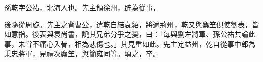 \begin{pinyinscope}
 
 
 孫乾字公祐，北海人也。先主領徐州，辟為從事，
 
 
 後隨從周旋。先主之背曹公，遣乾自結袁紹，將適荊州，乾又與麋笁俱使劉表，皆如意指。後表與袁尚書，說其兄弟分爭之變，曰：「每與劉左將軍、孫公祐共論此事，未甞不痛心入骨，相為悲傷也。」其見重如此。先主定益州，乾自從事中郎為秉忠將軍，見禮次麋笁，與簡雍同等。頃之，卒。
 
 
\end{pinyinscope}